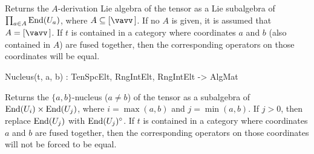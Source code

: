 Returns the $A$-derivation Lie algebra of the tensor as a Lie subalgebra of $\prod_{a\in A}\operatorname{End}(U_a)$, where $A\subseteq [\vav]$.
If no $A$ is given, it is assumed that $A=[\vav]$. 
If $t$ is contained in a category where coordinates $a$ and $b$ (also contained in $A$) are fused together, then the corresponding operators on those coordinates will be equal.

\begin{intrinsics}
Nucleus(t, a, b) : TenSpcElt, RngIntElt, RngIntElt -> AlgMat
\end{intrinsics}

Returns the $\{a,b\}$-nucleus ($a\ne b$) of the tensor as a subalgebra of $\operatorname{End}(U_i)\times \operatorname{End}(U_j)$, 
where $i=\max(a,b)$ and $j=\min(a,b)$.
If $j>0$, then replace $\operatorname{End}(U_j)$ with $\operatorname{End}(U_j)^\circ$. 
If $t$ is contained in a category where coordinates $a$ and $b$ are fused together, then the corresponding operators on those coordinates will not be forced to be equal.

